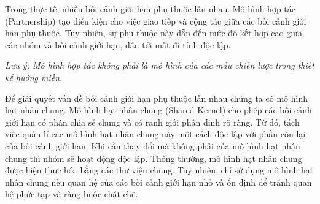 Trong thực tế,      nhiều    bối cảnh giới hạn phụ thuộc lẫn nhau.   Mô hình hợp tác (Partnership)   tạo điều kiện     cho việc giao tiếp và cộng tác giữa các       bối cảnh giới hạn phụ thuộc. Tuy nhiên,  sự phụ thuộc     này dẫn đến mức độ kết hợp cao giữa các nhóm và bối cảnh giới hạn,  dẫn tới mất đi tính độc lập. 

\textit{Lưu ý:    Mô hình hợp tác  không phải là mô hình  của  các mẫu chiến lược trong thiết kế huớng miền.}  


Để giải quyết vấn đề   bối cảnh giới hạn phụ thuộc lẫn nhau chúng ta có mô hình      hạt nhân chung.  Mô hình hạt nhân chung (Shared Kernel) cho phép   các    bối cảnh giới hạn  có phần chia sẻ chung  và  có  ranh giới   phân định rõ ràng.  Từ đó, tách việc quản lí các mô hình hạt nhân chung này một cách độc lập với phần còn lại của bối cảnh giới hạn. Khi cần  thay đổi mà không phải của mô hình hạt nhân chung thì nhóm sẽ   hoạt động độc lập.    Thông thường, mô hình hạt nhân chung được hiện thực hóa bằng các thư viện chung.      Tuy nhiên, chỉ sử dụng mô hình hạt nhân chung nếu quan hệ của các   bối cảnh giới hạn   nhỏ và ổn định   để tránh    quan hệ    phức tạp và ràng buộc  chặt chẽ.


